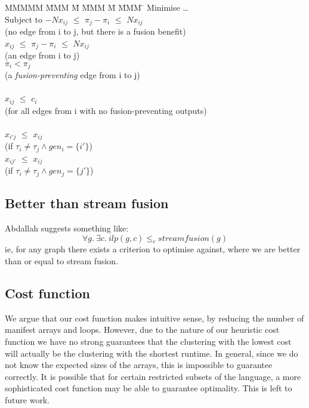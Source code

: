 \begin{tabbing}
MMMMM   \= MMM \= M \= MMM \= M \= MMM \= \kill
Minimise   \> \ldots \\
Subject to \> $-N x_{ij}$ \> $\le$ \> $\pi_j - \pi_i$ \> $\le$ \> $N x_{ij}$ \\
           \>             (no edge from i to j, but there is a fusion benefit)            \\
           \>    $x_{ij}$ \> $\le$ \> $\pi_j - \pi_i$ \> $\le$ \> $N x_{ij}$ \\
           \>             (an edge from i to j)            \\
           \>             \>       \> $\pi_i < \pi_j$ \>       \>            \\
           \>             (a \emph{fusion-preventing} edge from i to j)            \\
\\
           \> $x_{ij}$    \> $\le$ \> $c_i$           \>       \>            \\
           \> (for all edges from i with no fusion-preventing outputs)      \\
\\
           \> $x_{i'j}$   \> $\le$ \> $x_{ij}$        \>       \>            \\
           \> (if $\tau_i \not= \tau_j \wedge gen_i=\{i'\}$) \\
           \> $x_{ij'}$   \> $\le$ \> $x_{ij}$        \>       \>            \\
           \> (if $\tau_i \not= \tau_j \wedge gen_j=\{j'\}$) \\
\end{tabbing}


\subsection{Better than stream fusion}
Abdallah suggests something like:
\[
\forall g.\ \exists c.\ ilp(g, c) \le_c streamfusion(g)
\]
ie, for any graph there exists a criterion to optimise against, where we are better than or equal to stream fusion.

\subsection{Cost function}
We argue that our cost function makes intuitive sense, by reducing the number of manifest arrays and loops.
However, due to the nature of our heuristic cost function we have no strong guarantees that the clustering with the lowest cost will actually be the clustering with the shortest runtime.
In general, since we do not know the expected sizes of the arrays, this is impossible to guarantee correctly.
It is possible that for certain restricted subsets of the language, a more sophisticated cost function may be able to guarantee optimality.
This is left to future work.

